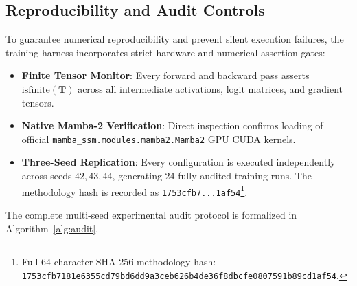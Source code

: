 \documentclass[conference]{IEEEtran}
\begin{document}
\subsection{Reproducibility and Audit Controls}
To guarantee numerical reproducibility and prevent silent execution failures, the training harness incorporates strict hardware and numerical assertion gates:
\begin{itemize}
    \item \textbf{Finite Tensor Monitor}: Every forward and backward pass asserts $\mathrm{isfinite}(\mathbf{T})$ across all intermediate activations, logit matrices, and gradient tensors.
    \item \textbf{Native Mamba-2 Verification}: Direct inspection confirms loading of official \texttt{mamba\_ssm.modules.mamba2.Mamba2} GPU CUDA kernels.
    \item \textbf{Three-Seed Replication}: Every configuration is executed independently across seeds $42, 43, 44$, generating 24 fully audited training runs. The methodology hash is recorded as \texttt{1753cfb7...1af54}\footnote{Full 64-character SHA-256 methodology hash: \texttt{1753cfb7181e6355cd79bd6dd9a3ceb6}\allowbreak\texttt{26b4de36f8dbcfe0807591b89cd1af54}.}.
\end{itemize}

The complete multi-seed experimental audit protocol is formalized in Algorithm~\ref{alg:audit}.
\end{document}
